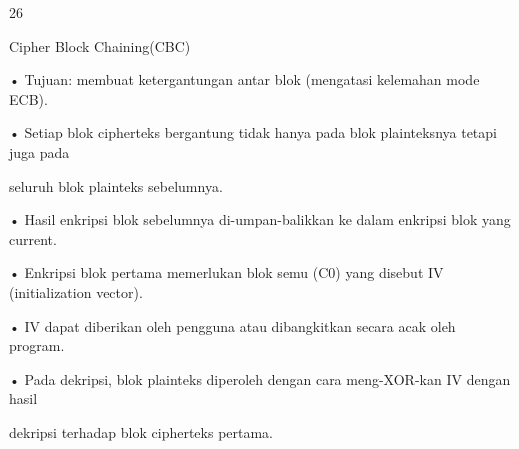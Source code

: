 \documentclass{article}
\begin{document}

26

Cipher Block Chaining(CBC)

• Tujuan: membuat ketergantungan antar blok (mengatasi kelemahan mode ECB).

• Setiap blok cipherteks bergantung tidak hanya pada blok plainteksnya tetapi juga pada 

seluruh blok plainteks sebelumnya.  


• Hasil enkripsi blok sebelumnya di-umpan-balikkan ke dalam enkripsi blok yang current.

• Enkripsi blok pertama memerlukan blok semu (C0) yang disebut IV (initialization vector). 

• IV dapat diberikan oleh pengguna atau dibangkitkan secara acak oleh program.

• Pada dekripsi, blok plainteks diperoleh  dengan cara meng-XOR-kan IV dengan hasil 

dekripsi terhadap blok cipherteks pertama.
\end{document}
